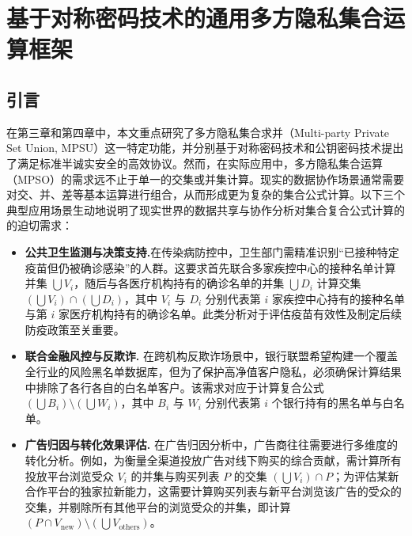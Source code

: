 \chapter{基于对称密码技术的通用多方隐私集合运算框架}

\section{引言}

在第三章和第四章中，本文重点研究了多方隐私集合求并（Multi-party Private Set Union, MPSU）这一特定功能，并分别基于对称密码技术和公钥密码技术提出了满足标准半诚实安全的高效协议。然而，在实际应用中，多方隐私集合运算（MPSO）的需求远不止于单一的交集或并集计算。现实的数据协作场景通常需要对交、并、差等基本运算进行组合，从而形成更为复杂的集合公式计算。以下三个典型应用场景生动地说明了现实世界的数据共享与协作分析对集合复合公式计算的的迫切需求：

\begin{itemize}
    \item \textbf{公共卫生监测与决策支持.}在传染病防控中，卫生部门需精准识别“已接种特定疫苗但仍被确诊感染”的人群。这要求首先联合多家疾控中心的接种名单计算并集 $\bigcup V_i$，随后与各医疗机构持有的确诊名单的并集 $\bigcup D_i$ 计算交集 $(\bigcup V_i) \cap (\bigcup D_i)$，其中 $V_i$ 与 $D_i$ 分别代表第 $i$ 家疾控中心持有的接种名单与第 $i$ 家医疗机构持有的确诊名单。此类分析对于评估疫苗有效性及制定后续防疫政策至关重要。

    \item \textbf{联合金融风控与反欺诈.} 在跨机构反欺诈场景中，银行联盟希望构建一个覆盖全行业的风险黑名单数据库，但为了保护高净值客户隐私，必须确保计算结果中排除了各行各自的白名单客户。该需求对应于计算复合公式 $(\bigcup B_i) \setminus (\bigcup W_i)$，其中 $B_i$ 与 $W_i$ 分别代表第 $i$ 个银行持有的黑名单与白名单。

    \item \textbf{广告归因与转化效果评估.} 在广告归因分析中，广告商往往需要进行多维度的转化分析。例如，为衡量全渠道投放广告对线下购买的综合贡献，需计算所有投放平台浏览受众 $V_i$ 的并集与购买列表 $P$ 的交集 $(\bigcup V_i) \cap P$；为评估某新合作平台的独家拉新能力，这需要计算购买列表与新平台浏览该广告的受众的交集，并剔除所有其他平台的浏览受众的并集，即计算 $(P \cap V_{\text{new}}) \setminus (\bigcup V_{\text{others}})$。
\end{itemize}


